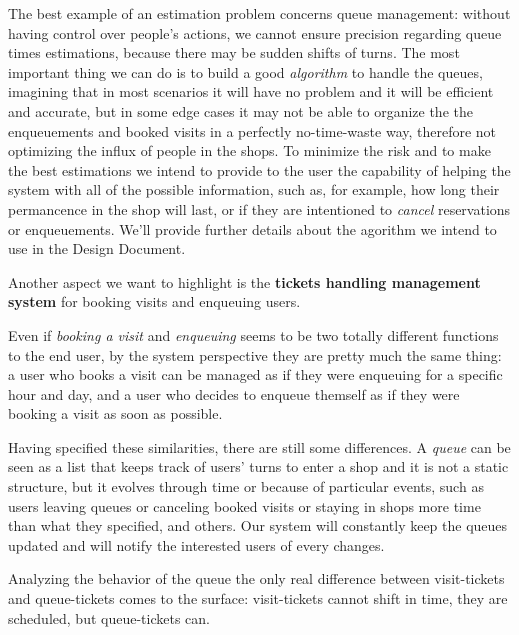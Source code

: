 The best example of an estimation problem concerns queue management: without having control over people's actions, we cannot ensure precision regarding queue times estimations, because there may be sudden shifts of turns. The most important thing we can do is to build a good \textit{algorithm} to handle the queues, imagining that in most scenarios it will have no problem and it will be efficient and accurate, but in some edge cases it may not be able to organize the the enqueuements and booked visits in a perfectly no-time-waste way, therefore not optimizing the influx of people in the shops. To minimize the risk and to make the best estimations we intend to provide to the user the capability of helping the system with all of the possible information, such as, for example, how long their permancence in the shop will last, or if they are intentioned to \textit{cancel} reservations or enqueuements. We'll provide further details about the agorithm we intend to use in the Design Document.

Another aspect we want to highlight is the \textbf{tickets handling management system} for booking visits and enqueuing users.

Even if \textit{booking a visit} and \textit{enqueuing} seems to be two totally different functions to the end user, by the system perspective they are pretty much the same thing: a user who books a visit can be managed as if they were enqueuing for a specific hour and day, and a user who decides to enqueue themself as if they were booking a visit as soon as possible. 

Having specified these similarities, there are still some differences. A \textit{queue} can be seen as a list that keeps track of users' turns to enter a shop and it is not a static structure, but it evolves through time or because of particular events, such as users leaving queues or canceling booked visits or staying in shops more time than what they specified, and others. Our system will constantly keep the queues updated and will notify the interested users of every changes. 

Analyzing the behavior of the queue the only real difference between visit-tickets and queue-tickets comes to the surface: visit-tickets cannot shift in time, they are scheduled, but queue-tickets can.

